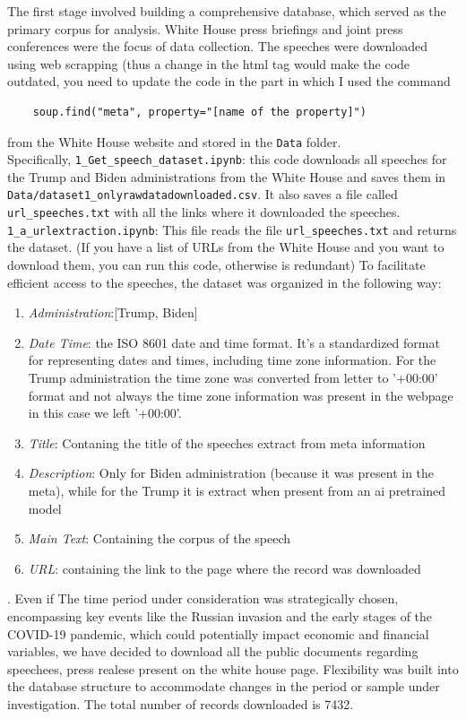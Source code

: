 \documentclass{article}
\begin{document}
The first stage involved building a comprehensive database, which served as the primary corpus for analysis. White House press briefings and joint press conferences were the focus of data collection. The speeches were downloaded using web scrapping (thus a change in the html tag would make the code outdated, you need to update the code in the part in which I used the command \begin{verbatim}
    soup.find("meta", property="[name of the property]")
\end{verbatim} from the White House website and stored in the \texttt{Data} folder. \\Specifically, \texttt{1\_Get\_speech\_dataset.ipynb}: this code downloads all speeches for the Trump and Biden administrations from the White House and saves them in \texttt{Data/dataset1\_onlyrawdatadownloaded.csv}. It also saves a file called \texttt{url\_speeches.txt} with all the links where it downloaded the speeches.
\- \texttt{1\_a\_urlextraction.ipynb}: This file reads the file \texttt{url\_speeches.txt} and returns the dataset. (If you have a list of URLs from the White House and you want to download them, you can run this code, otherwise is redundant)
To facilitate efficient access to the speeches, the dataset was organized in the following way:
\begin{enumerate}
    \item \textit{Administration}:[Trump, Biden]
    \item \textit{Date Time}: the ISO 8601 date and time format. It's a standardized format for representing dates and times, including time zone information. For the Trump administration the time zone was converted from letter to '+00:00' format and not always the time zone information was present in the webpage in this case we left '+00:00'.
    \item \textit{Title}: Contaning the title of the speeches extract from meta information
    \item \textit{Description}: Only for Biden administration (because it was present in the meta), while for the Trump it is extract when present from an ai pretrained model
    \item \textit{Main Text}: Containing the corpus of the speech
    \item \textit{URL}: containing the link to the page where the record was downloaded
\end{enumerate}. Even if The time period under consideration was strategically chosen, encompassing key events like the Russian invasion and the early stages of the COVID-19 pandemic, which could potentially impact economic and financial variables, we have decided to download all the public documents regarding speechees, press realese present on the white house page. Flexibility was built into the database structure to accommodate changes in the period or sample under investigation. The total number of records downloaded is 7432.
\end{document}
